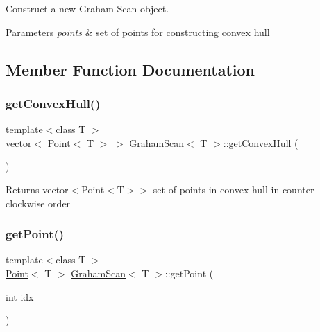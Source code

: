 Construct a new Graham Scan object. 


\begin{DoxyParams}{Parameters}
{\em points} & set of points for constructing convex hull \\
\hline
\end{DoxyParams}


\subsection{Member Function Documentation}
\mbox{\label{classGrahamScan_a0731f364efdbbb6028a38c623e99766d}} 
\subsubsection{\texorpdfstring{get\+Convex\+Hull()}{getConvexHull()}}
{\footnotesize\ttfamily template$<$class T $>$ \\
vector$<$ \mbox{\hyperlink{classPoint}{Point}}$<$ T $>$ $>$ \mbox{\hyperlink{classGrahamScan}{Graham\+Scan}}$<$ T $>$\+::get\+Convex\+Hull (\begin{DoxyParamCaption}{ }\end{DoxyParamCaption})}

\begin{DoxyReturn}{Returns}
vector$<$Point$<$\+T$>$$>$ set of points in convex hull in counter clockwise order 
\end{DoxyReturn}
\mbox{\label{classGrahamScan_ae6eec90fe568ee1b61ec1d8bba4c309e}} 
\subsubsection{\texorpdfstring{get\+Point()}{getPoint()}}
{\footnotesize\ttfamily template$<$class T $>$ \\
\mbox{\hyperlink{classPoint}{Point}}$<$ T $>$ \mbox{\hyperlink{classGrahamScan}{Graham\+Scan}}$<$ T $>$\+::get\+Point (\begin{DoxyParamCaption}\item[{int}]{idx }\end{DoxyParamCaption})\hspace{0.3cm}{\ttfamily [private]}}



